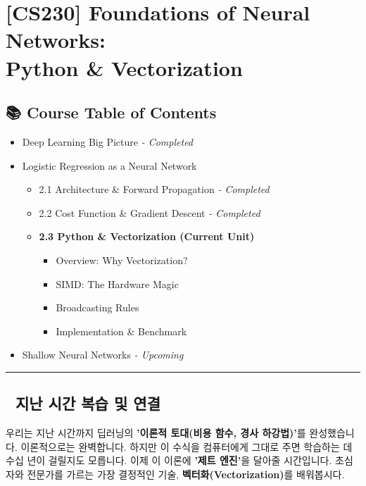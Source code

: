 \documentclass[11pt,a4paper]{book}
\theoremstyle{definition}
\begin{document}
\chapter{[CS230] Foundations of Neural Networks: \\ Python \& Vectorization}
\label{ch:lecture4}

\section*{📚 Course Table of Contents}
\begin{itemize}
    \item[Chapter 1.] Deep Learning Big Picture \textit{- Completed}
    \item[Chapter 2.] Logistic Regression as a Neural Network
    \begin{itemize}
        \item 2.1 Architecture \& Forward Propagation \textit{- Completed}
        \item 2.2 Cost Function \& Gradient Descent \textit{- Completed}
        \item \textbf{2.3 Python \& Vectorization (Current Unit)}
        \begin{itemize}
            \item Overview: Why Vectorization?
            \item SIMD: The Hardware Magic
            \item Broadcasting Rules
            \item Implementation \& Benchmark
        \end{itemize}
    \end{itemize}
    \item[Chapter 3.] Shallow Neural Networks \textit{- Upcoming}
\end{itemize}

\vspace{0.5cm}
\hrule
\vspace{0.5cm}

\section*{🔗 지난 시간 복습 및 연결}
우리는 지난 시간까지 딥러닝의 \textbf{'이론적 토대(비용 함수, 경사 하강법)'}를 완성했습니다. 이론적으로는 완벽합니다. 하지만 이 수식을 컴퓨터에게 그대로 주면 학습하는 데 수십 년이 걸릴지도 모릅니다. 이제 이 이론에 \textbf{'제트 엔진'}을 달아줄 시간입니다. 초심자와 전문가를 가르는 가장 결정적인 기술, \textbf{벡터화(Vectorization)}를 배워봅시다.
\end{document}
